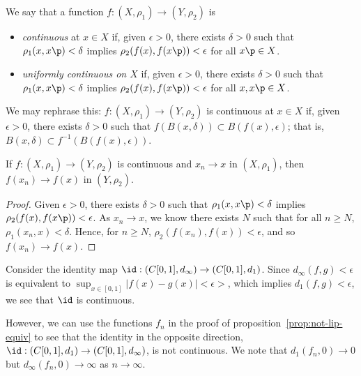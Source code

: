 \begin{definition}
	We say that a function $f:(X,\rho_1) \to (Y,\rho_2)$ is
	\begin{itemize}
		\shortskip
		\item \emph{continuous} at $x\in X$ if, given $\epsilon > 0$, there exists $\delta>0$ such that $\rho_1(x,x\p) < \delta$ implies $\rho_2(f(x), f(x\p))<\epsilon$ for all $x\p\in X$.
		\item \emph{uniformly continuous on $X$} if, given $\epsilon > 0$, there exists $\delta>0$ such that $\rho_1(x,x\p) < \delta$ implies $\rho_2(f(x), f(x\p))<\epsilon$ for all $x,x\p\in X$.
	\end{itemize}
\end{definition}

	\vspace{3pt}

\begin{remark}
	We may rephrase this: $f: (X,\rho_1) \to (Y,\rho_2)$ is continuous at $x\in X$ if, given $\epsilon>0$, there exists $\delta>0$ such that $f(B(x,\delta)) \subset B(f(x),\epsilon)$; that is, $B(x,\delta) \subset f^{-1}(B(f(x),\epsilon))$.
\end{remark}

	\pagebreak

\begin{lemma}
	If $f:(X,\rho_1) \to (Y,\rho_2)$ is continuous and $x_n\to x$ in $(X,\rho_1)$, then $f(x_n) \to f(x)$ in $(Y,\rho_2)$.
\end{lemma}

\begin{proof}
	Given $\epsilon>0$, there exists $\delta>0$ such that $\rho_1(x,x\p)<\delta$ implies $\rho_2(f(x),f(x\p)) < \epsilon$. As $x_n\to x$, we know there exists $N$ such that for all $n\geq N$, $\rho_1(x_n,x)<\delta$. Hence, for $n\geq N$, $\rho_2(f(x_n),f(x))<\epsilon$, and so $f(x_n) \to f(x)$.
\end{proof}

\begin{example}
	Consider the identity map $\id: (C[0,1],d_\infty) \to (C[0,1],d_1)$. Since $d_\infty(f,g) < \epsilon$ is equivalent to $\sup_{x\in [0,1]} \left\vert f(x)-g(x) \right\vert< \epsilon>$, which implies $d_1(f,g)<\epsilon$, we see that $\id$ is continuous.

	However, we can use the functions $f_n$ in the proof of proposition~\ref{prop:not-lip-equiv} to see that the identity in the opposite direction, $\id:(C[0,1], d_1) \to (C[0,1], d_\infty)$, is not continuous. We note that $d_1(f_n,0) \to0$ but $d_\infty(f_n,0) \to \infty$ as $n\to\infty$.
\end{example}

